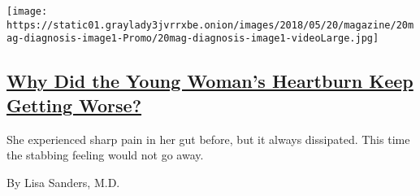 \begin{enumerate}
  \texttt{[image: https://static01.graylady3jvrrxbe.onion/images/2018/05/20/magazine/20mag-diagnosis-image1-Promo/20mag-diagnosis-image1-videoLarge.jpg]}

  \hypertarget{why-did-the-young-womans-heartburn-keep-getting-worse}{%
  \subsection{\texorpdfstring{\href{/2018/05/16/magazine/why-did-the-young-womans-heartburn-keep-getting-worse.html}{Why
  Did the Young Woman's Heartburn Keep Getting
  Worse?}}{Why Did the Young Woman's Heartburn Keep Getting Worse?}}\label{why-did-the-young-womans-heartburn-keep-getting-worse}}

  She experienced sharp pain in her gut before, but it always
  dissipated. This time the stabbing feeling would not go away.

  By Lisa Sanders, M.D.
\end{enumerate}

